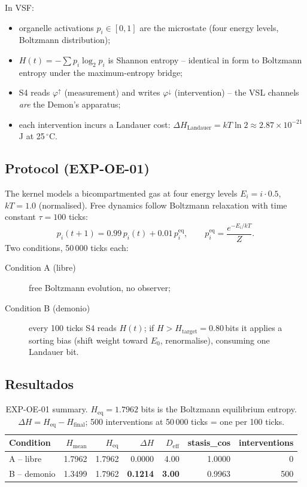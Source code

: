 \documentclass[11pt, a4paper]{article}
\begin{document}
In VSF:
\begin{itemize}
  \item organelle activations $p_i \in [0,1]$ are the microstate (four energy
    levels, Boltzmann distribution);
  \item $H(t) = -\sum p_i \log_2 p_i$ is Shannon entropy -- identical in form
    to Boltzmann entropy under the \citet{jaynes1957information} maximum-entropy bridge;
  \item S4 reads $\varphi^\uparrow$ (measurement) and writes $\varphi^\downarrow$
    (intervention) -- the VSL channels \emph{are} the Demon's apparatus;
  \item each intervention incurs a Landauer cost: $\Delta H_\text{Landauer} =
    kT \ln 2 \approx 2.87 \times 10^{-21}$\,J at 25\,$^\circ$C.
\end{itemize}

\subsection{Protocol (EXP-OE-01)}

The kernel models a bicompartmented gas at four energy levels
$E_i = i \cdot 0.5$, $kT = 1.0$ (normalised).  Free dynamics follow
Boltzmann relaxation with time constant $\tau = 100$ ticks:
\[
  p_i(t+1) = 0.99\,p_i(t) + 0.01\,p_i^\text{eq},
  \qquad p_i^\text{eq} = \frac{e^{-E_i/kT}}{Z}.
\]
Two conditions, 50\,000 ticks each:
\begin{description}
  \item[Condition A (libre)] free Boltzmann evolution, no observer;
  \item[Condition B (demonio)] every 100 ticks S4 reads $H(t)$; if
    $H > H_\text{target} = 0.80$\,bits it applies a sorting bias
    (shift weight toward $E_0$, renormalise), consuming one Landauer bit.
\end{description}

\subsection{Resultados}

\begin{table}[h]
\centering
\begin{tabular}{lrrrrrr}
\hline
Condition & $H_\text{mean}$ & $H_\text{eq}$ & $\Delta H$ & $D_\text{eff}$
          & stasis\_cos & interventions \\
\hline
A -- libre    & 1.7962 & 1.7962 & 0.0000 & 4.00 & 1.0000 & 0   \\
B -- demonio  & 1.3499 & 1.7962 & \textbf{0.1214} & \textbf{3.00} & 0.9963 & 500 \\
\hline
\end{tabular}
\caption{EXP-OE-01 summary.  $H_\text{eq} = 1.7962$ bits is the Boltzmann
equilibrium entropy.  $\Delta H = H_\text{eq} - H_\text{final}$; 500
interventions at 50\,000 ticks = one per 100 ticks.}
\label{tab:maxwell}
\end{table}
\end{document}
